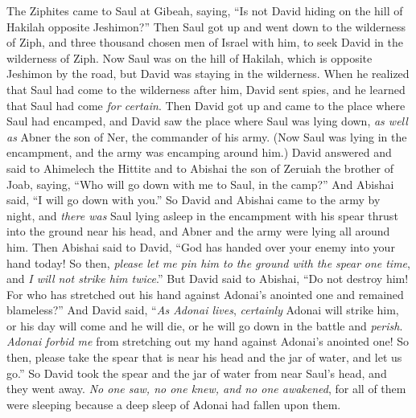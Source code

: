 \begin{biblechapter} %
 The Ziphites came to Saul at Gibeah, saying, “Is not David hiding on the hill of Hakilah opposite Jeshimon?”
\verse Then Saul got up and went down to the wilderness of Ziph, and three thousand chosen men of Israel with him, to seek David in the wilderness of Ziph.
\verse Now Saul was on the hill of Hakilah, which is opposite Jeshimon by the road, but David was staying in the wilderness. When he realized that Saul had come to the wilderness after him,
\verse David sent spies, and he learned that Saul had come \textit{for certain}.
\verse Then David got up and came to the place where Saul had encamped, and David saw the place where Saul was lying down, \textit{as well as} Abner the son of Ner, the commander of his army. (Now Saul was lying in the encampment, and the army was encamping around him.)
\verse David answered and said to Ahimelech the Hittite and to Abishai the son of Zeruiah the brother of Joab, saying, “Who will go down with me to Saul, in the camp?” And Abishai said, “I will go down with you.”
\verse So David and Abishai came to the army by night, and \textit{there was} Saul lying asleep in the encampment with his spear thrust into the ground near his head, and Abner and the army were lying all around him.
\verse Then Abishai said to David, “God has handed over your enemy into your hand today! So then, \textit{please let me pin him to the ground with the spear} \textit{one time}, and \textit{I will not strike him twice}.”
\verse But David said to Abishai, “Do not destroy him! For who has stretched out his hand against Adonai’s anointed one and remained blameless?”
\verse And David said, “\textit{As Adonai lives}, \textit{certainly} Adonai will strike him, or his day will come and he will die, or he will go down in the battle and \textit{perish}.
\verse \textit{Adonai forbid me} from stretching out my hand against Adonai’s anointed one! So then, please take the spear that is near his head and the jar of water, and let us go.”
\verse So David took the spear and the jar of water from near Saul’s head, and they went away. \textit{No one saw, no one knew, and no one awakened}, for all of them were sleeping because a deep sleep of Adonai had fallen upon them.

\end{biblechapter}
